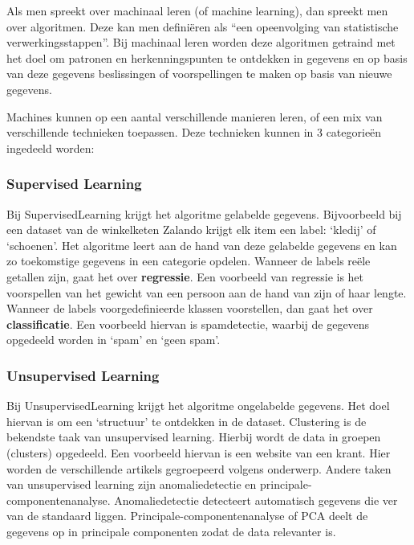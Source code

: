 Als men spreekt over machinaal leren (of machine learning), dan spreekt men over algoritmen. Deze kan men definiëren als “een opeenvolging van statistische verwerkingsstappen”. Bij machinaal leren worden deze algoritmen getraind met het doel om patronen en herkenningspunten te ontdekken in gegevens en op basis van deze gegevens beslissingen of voorspellingen te maken op basis van nieuwe gegevens. \autocite{IBM2020a}

Machines kunnen op een aantal verschillende manieren leren, of een mix van verschillende technieken toepassen. Deze technieken kunnen in 3 categorieën ingedeeld worden:

\subsubsection{Supervised Learning}
\label{sec:supervisedlearning}
Bij \gls{SupervisedLearning} krijgt het algoritme gelabelde gegevens. Bijvoorbeeld bij een dataset van de winkelketen Zalando krijgt elk item een label: ‘kledij’ of ‘schoenen’. Het algoritme leert aan de hand van deze gelabelde gegevens en kan zo toekomstige gegevens in een categorie opdelen. Wanneer de labels reële getallen zijn, gaat het over \textbf{regressie}. Een voorbeeld van regressie is het voorspellen van het gewicht van een persoon aan de hand van zijn of haar lengte. Wanneer de labels voorgedefinieerde klassen voorstellen, dan gaat het over \textbf{classificatie}. Een voorbeeld hiervan is spamdetectie, waarbij de gegevens opgedeeld worden in ‘spam’ en ‘geen spam’.\autocite{Lievens2020} 

\subsubsection{Unsupervised Learning}
\label{sec:unsupervisedlearning}
Bij \gls{UnsupervisedLearning} krijgt het algoritme ongelabelde gegevens. Het doel hiervan is om een ‘structuur’ te ontdekken in de dataset. Clustering is de bekendste taak van unsupervised learning. Hierbij wordt de data in groepen (clusters) opgedeeld. Een voorbeeld hiervan is een website van een krant. Hier worden de verschillende artikels gegroepeerd volgens onderwerp. \autocite{Lievens2020}
Andere taken van unsupervised learning zijn anomaliedetectie en principale-componentenanalyse. Anomaliedetectie detecteert automatisch gegevens die ver van de standaard liggen. Principale-componentenanalyse of PCA deelt de gegevens op in principale componenten zodat de data relevanter is. 

